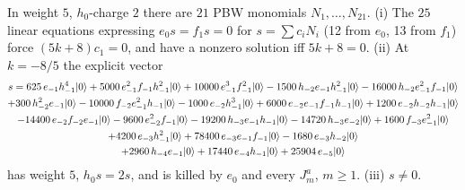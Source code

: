 \begin{theorem}[The weight-5 singular vector at $k=-8/5$]\label{l08:thm:sing85}
In weight $5$, $h_0$-charge $2$ there are $21$ PBW monomials $N_1,\ldots,N_{21}$. (i) The $25$ linear
equations expressing $e_0s=f_1s=0$ for $s=\sum c_iN_i$ (12 from $e_0$, 13 from $f_1$) force
$(5k+8)c_1 = 0$, and have a nonzero solution iff $5k+8=0$. (ii) At $k=-8/5$ the explicit vector
\begin{multline*}
s = 625\,e_{-1}h_{-1}^4|0\rangle + 5000\,e_{-1}^2f_{-1}h_{-1}^2|0\rangle + 10000\,e_{-1}^3f_{-1}^2|0\rangle
-1500\,h_{-2}e_{-1}h_{-1}^2|0\rangle -16000\,h_{-2}e_{-1}^2f_{-1}|0\rangle\\
+300\,h_{-2}^2e_{-1}|0\rangle -10000\,f_{-2}e_{-1}^2h_{-1}|0\rangle -1000\,e_{-2}h_{-1}^3|0\rangle
+6000\,e_{-2}e_{-1}f_{-1}h_{-1}|0\rangle + 1200\,e_{-2}h_{-2}h_{-1}|0\rangle\\
-14400\,e_{-2}f_{-2}e_{-1}|0\rangle -9600\,e_{-2}^2f_{-1}|0\rangle -19200\,h_{-3}e_{-1}h_{-1}|0\rangle
-14720\,h_{-3}e_{-2}|0\rangle +1600\,f_{-3}e_{-1}^2|0\rangle\\
+4200\,e_{-3}h_{-1}^2|0\rangle +78400\,e_{-3}e_{-1}f_{-1}|0\rangle -1680\,e_{-3}h_{-2}|0\rangle\\
+2960\,h_{-4}e_{-1}|0\rangle +17440\,e_{-4}h_{-1}|0\rangle +25904\,e_{-5}|0\rangle
\end{multline*}
has weight $5$, $h_0s = 2s$, and is killed by $e_0$ and every $J^a_m$, $m\ge1$. (iii) $s\ne0$.
\end{theorem}

